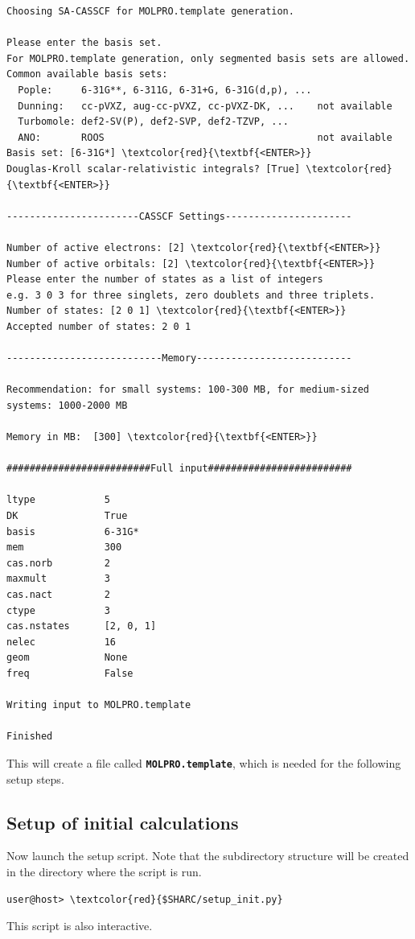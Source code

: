 \documentclass[a4paper,11pt,DIV=15,openany]{scrbook}
\newcommand{\ttt}[1]{\textbf{\texttt{#1}}}
\begin{document}
\begin{oframed}
\begin{Verbatim}[commandchars=\\\{\}]
Choosing SA-CASSCF for MOLPRO.template generation.

Please enter the basis set.
For MOLPRO.template generation, only segmented basis sets are allowed.
Common available basis sets:
  Pople:     6-31G**, 6-311G, 6-31+G, 6-31G(d,p), ...
  Dunning:   cc-pVXZ, aug-cc-pVXZ, cc-pVXZ-DK, ...    not available
  Turbomole: def2-SV(P), def2-SVP, def2-TZVP, ...
  ANO:       ROOS                                     not available
Basis set: [6-31G*] \textcolor{red}{\textbf{<ENTER>}}
Douglas-Kroll scalar-relativistic integrals? [True] \textcolor{red}{\textbf{<ENTER>}}

-----------------------CASSCF Settings----------------------

Number of active electrons: [2] \textcolor{red}{\textbf{<ENTER>}}
Number of active orbitals: [2] \textcolor{red}{\textbf{<ENTER>}}
Please enter the number of states as a list of integers
e.g. 3 0 3 for three singlets, zero doublets and three triplets.
Number of states: [2 0 1] \textcolor{red}{\textbf{<ENTER>}}
Accepted number of states: 2 0 1

---------------------------Memory---------------------------

Recommendation: for small systems: 100-300 MB, for medium-sized systems: 1000-2000 MB

Memory in MB:  [300] \textcolor{red}{\textbf{<ENTER>}}

#########################Full input#########################

ltype            5
DK               True
basis            6-31G*
mem              300
cas.norb         2
maxmult          3
cas.nact         2
ctype            3
cas.nstates      [2, 0, 1]
nelec            16
geom             None
freq             False

Writing input to MOLPRO.template

Finished

\end{Verbatim}
\end{oframed}

\normalsize
This will create a file called \ttt{MOLPRO.template}, which is needed for the following setup steps.

\subsection{Setup of initial calculations}

Now launch the setup script. Note that the subdirectory structure will be created in the directory where the script is run.
\begin{Verbatim}[commandchars=\\\{\}]
user@host> \textcolor{red}{$SHARC/setup_init.py}
\end{Verbatim}
This script is also interactive. 
\end{document}
